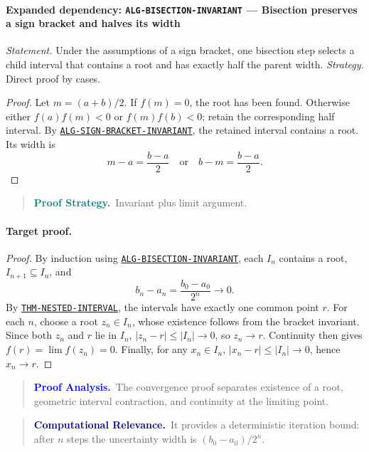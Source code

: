 \documentclass[10pt]{article}
\newcommand{\pidraw}[1]{\begingroup\urlstyle{tt}\nolinkurl{#1}\endgroup}
\newcommand{\pidref}[1]{\hyperref[prf:#1]{\pidraw{#1}}}
\newcommand{\pid}[1]{\pidref{#1}}
\theoremstyle{definition}
\theoremstyle{remark}
\newenvironment{proofstrategy}
{\begin{quote}\small\noindent\textbf{\textcolor{teal}{Proof Strategy.}}\ }
{\end{quote}}
\newenvironment{proofanalysis}
{\begin{quote}\small\noindent\textbf{\textcolor{blue}{Proof Analysis.}}\ }
{\end{quote}}
\newenvironment{computationalrelevance}
{\begin{quote}\small\noindent\textbf{\textcolor{navy}{Computational Relevance.}}\ }
{\end{quote}}
\begin{document}
\paragraph{Expanded dependency: \pidraw{ALG-BISECTION-INVARIANT} --- Bisection preserves a sign bracket and halves its width}
\textit{Statement.} Under the assumptions of a sign bracket, one bisection step selects a child interval that contains a root and has exactly half the parent width.
\textit{Strategy.} Direct proof by cases.
\begin{proof}Let $m=(a+b)/2$. If $f(m)=0$, the root has been found. Otherwise either
$f(a)f(m)<0$ or $f(m)f(b)<0$; retain the corresponding half interval.
By \pid{ALG-SIGN-BRACKET-INVARIANT}, the retained interval contains a root.
Its width is
\[
m-a=\frac{b-a}{2}
\quad\text{or}\quad
b-m=\frac{b-a}{2}.
\]\end{proof}

\begin{proofstrategy}Invariant plus limit argument.\end{proofstrategy}

\paragraph{Target proof.}

\begin{proof}

By induction using \pid{ALG-BISECTION-INVARIANT}, each $I_n$ contains a root,
$I_{n+1}\subseteq I_n$, and
\[
b_n-a_n=\frac{b_0-a_0}{2^n}\to0.
\]
By \pid{THM-NESTED-INTERVAL}, the intervals have exactly one common point $r$.
For each $n$, choose a root $z_n\in I_n$, whose existence follows from the bracket
invariant. Since both $z_n$ and $r$ lie in $I_n$,
$|z_n-r|\le |I_n|\to0$, so $z_n\to r$. Continuity then gives
$f(r)=\lim f(z_n)=0$. Finally, for any $x_n\in I_n$,
$|x_n-r|\le|I_n|\to0$, hence $x_n\to r$.

\end{proof}

\begin{proofanalysis}The convergence proof separates existence of a root, geometric interval contraction, and continuity at the limiting point.\end{proofanalysis}

\begin{computationalrelevance}It provides a deterministic iteration bound: after $n$ steps the uncertainty width is $(b_0-a_0)/2^n$.\end{computationalrelevance}
\end{document}
